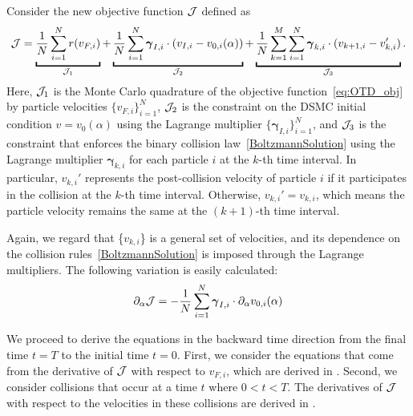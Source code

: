 \documentclass[times,final,nopreprintline]{elsarticle}
\newcommand{\bgamma}{\boldsymbol \gamma}
\begin{document}
Consider the new objective function $\mathcal J$ defined as
\begin{equation} \label{eq:DTO_obj}
\cJ = \underbracket{\frac{1}{N}\sum_{i=1}^N r(v_{{F},i})}_{\cJ_1} +\underbracket{ \frac{1}{N}\sum_{i=1}^N \bgamma_{I,i} \cdot (v_{I, i}- v_{0,i}(\alpha) )}_{\cJ_2}+\underbracket{\frac{1}{N} \sum_{k=1}^M \sum_{i=1}^N \bgamma_{k,i} \cdot (v_{k+1,i}-v_{k,i}')}_{\cJ_3}.
\end{equation}
Here, $\mathcal J_1$ is the Monte Carlo quadrature of the objective function~\eqref{eq:OTD_obj} by particle velocities $\{v_{F,i}\}_{i=1}^N$, $\mathcal J_2$ is the constraint on the DSMC initial condition $v=v_0(\alpha)$ using the Lagrange multiplier $ \{\bgamma_{I,i}\}_{i=1}^N$, and $\mathcal J_3$ is the constraint that enforces the binary collision law~\eqref{BoltzmannSolution} using the Lagrange multiplier $\bgamma_{k,i}$ for each particle $i$ at the $k$-th time interval. In particular, $v_{k,i}'$ represents the post-collision velocity of particle $i$ if it participates in the collision at the $k$-th time interval. Otherwise, $v_{k,i}' = v_{k,i}$, which means the particle velocity remains the same at the $(k+1)$-th time interval. 

 

Again, we regard that \{$v_{k,i}$\} is a general set of velocities, and its dependence on the collision rules~\eqref{BoltzmannSolution} is imposed through the Lagrange multipliers.
The following variation is easily calculated:
\begin{equation}
\partial_\alpha \cJ=- \frac{1}{N} \sum_{i=1}^N \bgamma_{{I},i} \cdot \partial_\alpha v_{0,i}(\alpha) \label{DalphaEqtn}
\end{equation}

We proceed to derive the equations in the backward time direction from the final time $t=T$ to the initial time $t=0$. First, we consider the equations that come from the derivative of $\mathcal J$ with respect to $v_{{F},i}$, which are derived in . Second, we consider collisions that occur at a time $t$ where $0 < t<T$. 
The derivatives of $\mathcal J$ with respect to the velocities in these collisions are derived in .
\end{document}

